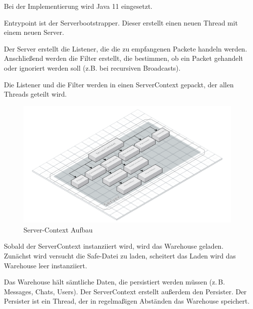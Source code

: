 
Bei der Implementierung wird Java 11 eingesetzt.




    Entrypoint ist der Serverbootstrapper. Dieser erstellt einen neuen Thread mit einem neuen Server. 
    
    Der Server erstellt die Listener, die die zu empfangenen Packete handeln werden. Anschließend werden die Filter erstellt, die bestimmen, ob ein Packet gehandelt oder ignoriert werden soll (z.B. bei recursiven Broadcasts).
    
    
    Die Listener und die Filter werden in einen ServerContext gepackt, der allen Threads geteilt wird.

    \begin{figure}[h]
        \centering
        \includegraphics[width=\textwidth]{VS-Server-Context.png}
        
        \caption{Server-Context Aufbau}
        \label{}
    \end{figure}

    Sobald der ServerContext instanziiert wird, wird das Warehouse geladen. Zunächst wird versucht die Safe-Datei zu laden, scheitert das Laden wird das Warehouse leer instanziiert.
    
    
    Das Warehouse hält sämtliche Daten, die persistiert werden müssen (z.\,B. Messages, Chats, Users). Der ServerContext erstellt außerdem den Persister. Der Persister ist ein Thread, der in regelmaßigen Abständen das Warehouse speichert.
    
    
    
